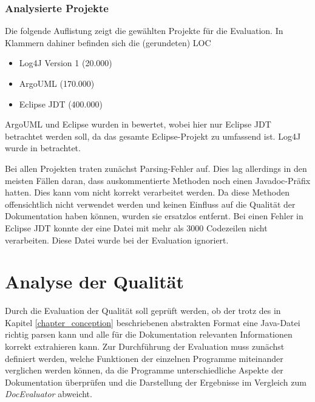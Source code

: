  \subsubsection{Analysierte Projekte}\label{chapter:eval_projects}
 Die folgende Auflistung zeigt die gewählten Projekte für die Evaluation. In Klammern dahiner befinden sich die  (gerundeten) \ac{LOC}
 \begin{itemize}
  \item Log4J Version 1 (20.000)
    \item ArgoUML (170.000)
     \item Eclipse \ac{JDT} (400.000)
 \end{itemize}
 
 ArgoUML und Eclipse wurden in \cite[S. 74] {AutomaticQualityAssessmentofSourceCodeComments:TheJavadocMiner} bewertet, wobei hier nur Eclipse \ac{JDT} betrachtet werden soll, da das gesamte Eclipse-Projekt zu umfassend ist. Log4J wurde in \cite[S. 267] {@tComment:TestingJavadocCommentstoDetectComment-CodeInconsistencies} betrachtet. 

 Bei allen Projekten traten zunächst Parsing-Fehler auf. Dies lag allerdings in den meisten Fällen daran, dass auskommentierte Methoden noch einen Javadoc-Präfix hatten. Dies kann vom \doceval nicht korrekt verarbeitet werden. Da diese Methoden offensichtlich nicht verwendet werden und keinen Einfluss auf die Qualität der Dokumentation haben können, wurden sie ersatzlos entfernt. Bei einen Fehler in Eclipse \ac{JDT} konnte der \doceval eine Datei mit mehr als 3000 Codezeilen nicht verarbeiten. Diese Datei wurde bei der Evaluation ignoriert.
\section{Analyse der Qualität}
Durch die Evaluation der Qualität soll geprüft werden, ob der \doceval trotz des in Kapitel \ref{chapter_conception}
 beschriebenen abstrakten Format eine Java-Datei richtig parsen kann und alle für die Dokumentation relevanten Informationen korrekt extrahieren kann. Zur Durchführung der Evaluation muss zunächst definiert werden, welche Funktionen der einzelnen Programme miteinander verglichen werden können, da die Programme unterschiedliche Aspekte der Dokumentation überprüfen und die Darstellung der Ergebnisse im Vergleich zum \textit{DocEvaluator} abweicht.

